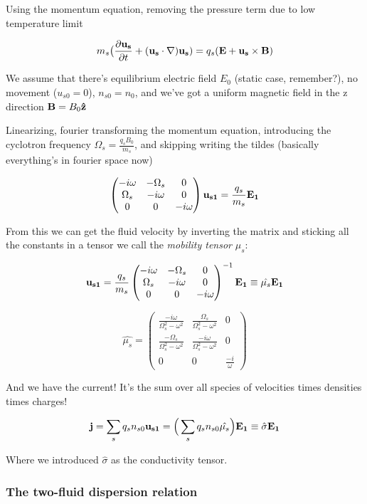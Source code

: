 \documentclass[PlasmaNotes.tex]{subfiles}
\begin{document}
Using the momentum equation, removing the pressure term due to low temperature limit

\[ m_s \big( \frac{\partial \mathbf{u_s}}{\partial t} + (\mathbf{u_s} \cdot \mathbf{\nabla}) \mathbf{u_s}) = q_s (\mathbf{E} + \mathbf{u_s} \times \mathbf{B}) \]

We assume that there's equilibrium electric field $E_0$ (static case, remember?), no movement ($u_{s0} = 0$), $n_{s0} = n_0$, and we've got a uniform magnetic field in the z direction $\mathbf{B} = B_0 \mathbf{\hat{z}}$

Linearizing, fourier transforming the momentum equation, introducing the cyclotron frequency $\Omega_s = \frac{q_s B_0}{m_s}$, and skipping writing the tildes (basically everything's in fourier space now)

\[ \begin{pmatrix}
-i\omega & -\Omega_s & 0 \\
\Omega_s & -i\omega & 0 \\
0 & 0 & -i\omega
\end{pmatrix} \mathbf{u_{s1}} = \frac{q_s}{m_s} \mathbf{E_1} \]

From this we can get the fluid velocity by inverting the matrix and sticking all the constants in a tensor we call the \emph{mobility tensor} $\mu_s$:

\[ \mathbf{u_{s1}} = \frac{q_s}{m_s}
\begin{pmatrix}
-i\omega & -\Omega_s & 0 \\
\Omega_s & -i\omega & 0 \\
0 & 0 & -i\omega
\end{pmatrix}^{-1} \mathbf{E_1} \equiv \hat{\mu_s} \mathbf{E_1}
 \]

\[ \hat{\mu_s} = \begin{pmatrix}
\frac{-i\omega}{\Omega_s^2-\omega^2} & \frac{\Omega_s}{\Omega_s^2-\omega^2} & 0 \\
\frac{-\Omega_s}{\Omega_s^2-\omega^2} & \frac{-i\omega}{\Omega_s^2-\omega^2} & 0 \\
0 & 0 & \frac{-i}{\omega}
\end{pmatrix} \]


And we have the current! It's the sum over all species of velocities times densities times charges!

\[ \mathbf{j} = \sum_s{q_s n_{s0} \mathbf{u_{s1}}} = \Big(\sum_s{q_s n_{s0} \hat{\mu_s}}\Big) \mathbf{E_1} \equiv \hat{\sigma} \mathbf{E_1} \]

Where we introduced $\hat{\sigma}$ as the conductivity tensor.

\subsubsection{The two-fluid dispersion relation}
\end{document}
